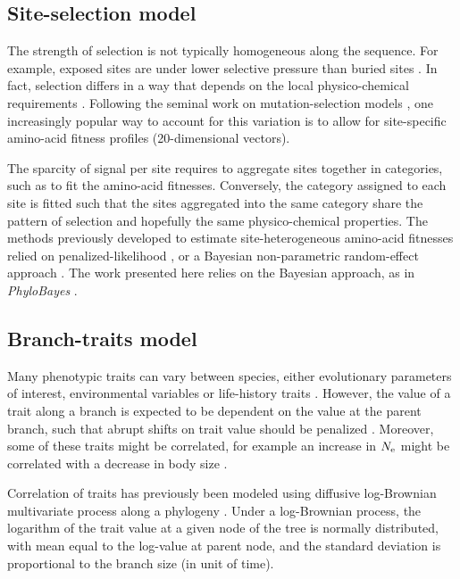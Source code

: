 \subsection{Site-selection model}
\label{sec:SiteHetero}
The strength of selection is not typically homogeneous along the sequence.
For example, exposed sites are under lower selective pressure than buried sites \citep{Echave2016}.
In fact, selection differs in a way that depends on the local physico-chemical requirements \citep{Goldstein2016,Goldstein2017,Weber2019}.
Following the seminal work on mutation-selection models \citep{Halpern1998}, one increasingly popular way to account for this variation is to allow for site-specific amino-acid fitness profiles (20-dimensional vectors).

The sparcity of signal per site requires to aggregate sites together in categories, such as to fit the amino-acid fitnesses.
Conversely, the category assigned to each site is fitted such that the sites aggregated into the same category share the pattern of selection and hopefully the same physico-chemical properties.
The methods previously developed to estimate site-heterogeneous amino-acid fitnesses relied on penalized-likelihood \citep{Tamuri2012,Tamuri2014}, or a Bayesian non-parametric random-effect approach \citep{Rodrigue2010,Rodrigue2014,Rodrigue2016}.
The work presented here relies on the Bayesian approach, as in \textit{PhyloBayes} \citep{Rodrigue2010}.

\subsection{Branch-traits model}
\label{sec:BranchHetero}
Many phenotypic traits can vary between species, either evolutionary parameters of interest, environmental variables or life-history traits \citep{Felsenstein1985,Romiguier2014}.
However, the value of a trait along a branch is expected to be dependent on the value at the parent branch, such that abrupt shifts on trait value should be penalized \citep{Huelsenbeck2003,Seo2004}.
Moreover, some of these traits might be correlated, for example an increase in $N_{\mathrm{e}}$ might be correlated with a decrease in body size \citep{Weber2014,Romiguier2014}.

Correlation of traits has previously been modeled using diffusive log-Brownian multivariate process along a phylogeny \citep{Seo2004,Lartillot2011}.
Under a log-Brownian process, the logarithm of the trait value at a given node of the tree is normally distributed, with mean equal to the log-value at parent node, and the standard deviation is proportional to the branch size (in unit of time).

